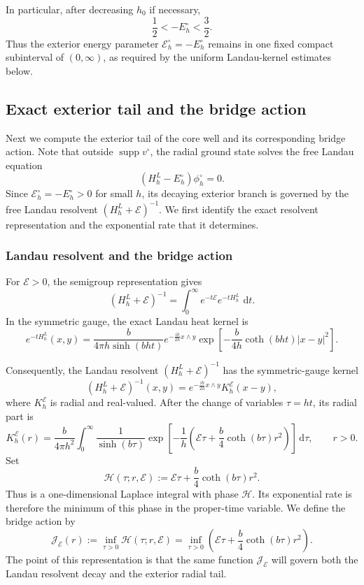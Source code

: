 \documentclass[11pt]{article}
\newcommand{\dd}{\,\mathrm d}
\newcommand{\cE}{\mathcal E}
\newcommand{\cJ}{\mathcal J}
\newcommand{\wedgep}{\mathbin{\wedge}}
\newcommand{\supp}{\operatorname{supp}}
\begin{document}
In particular, after decreasing $h_0$ if necessary,
\begin{equation}\label{eq:radial-energy-window}
 \frac12<-E_h^\circ<\frac32.
\end{equation}
Thus the exterior energy parameter $\cE_h^\circ=-E_h^\circ$ remains in one
fixed compact subinterval of $(0,\infty)$, as required by the uniform
Landau-kernel estimates below. 

\subsection{Exact exterior tail and the bridge action}\label{sec:radial-exterior-tail}
Next we compute the exterior tail of the core well and its corresponding bridge action. Note that outside $\supp v^\circ$, the radial ground state solves the free Landau
equation
\[
 (H_h^L-E_h^\circ)\phi_h^\circ=0.
\]
Since $\cE_h^\circ=-E_h^\circ>0$ for small $h$, its decaying exterior branch is governed by the free Landau resolvent $(H_h^L+\cE)^{-1}$.  We first identify the exact resolvent representation and the exponential rate that it determines.

\subsubsection{Landau resolvent and the bridge action}
For $\cE>0$, the semigroup representation gives
\[
 (H_h^L+\cE)^{-1}
 =\int_0^\infty e^{-t\cE}e^{-tH_h^L}\,\dd t.
\]
In the symmetric gauge, the exact Landau heat kernel is
\[
 e^{-tH_h^L}(x,y)
 =\frac{b}{4\pi h\sinh(bht)}
 e^{-\frac{ib}{2h}x\wedgep y}
 \exp\!\left[-\frac{b}{4h}\coth(bht)|x-y|^2\right].
\]

Consequently, the Landau resolvent $(H_h^L+\cE)^{-1}$ has the symmetric-gauge kernel
\begin{equation}\label{eq:landau-kernel-master}
 (H_h^L+\cE)^{-1}(x,y)
 =e^{-\frac{ib}{2h}x\wedgep y}K_h^\cE(x-y),
\end{equation}
where $K_h^\cE$ is radial and real-valued.   After the change of variables $\tau=ht$, its radial part is
\begin{equation}\label{eq:K-integral}
 K_h^{\cE}(r)
 =\frac{b}{4\pi h^2}
 \int_0^\infty
 \frac{1}{\sinh(b\tau)}
 \exp\!\left[-\frac1h\left(
 \cE\tau+\frac b4\coth(b\tau)r^2
 \right)\right]\dd\tau,
 \qquad r>0.
\end{equation}
Set
\[
 \mathcal H(\tau;r,\cE)
 :=\cE\tau+\frac b4\coth(b\tau)r^2.
\]
Thus  is a one-dimensional Laplace integral with phase $\mathcal H$.  Its exponential rate is therefore the minimum of this phase in the proper-time variable.  We define the bridge action by
\begin{equation}\label{eq:J}
 \cJ_\cE(r)
 :=\inf_{\tau>0}\mathcal H(\tau;r,\cE)
 =\inf_{\tau>0}\left(\cE\tau+\frac b4\coth(b\tau)r^2\right).
\end{equation}
The point of this representation is that the same function $\cJ_\cE$ will govern both the Landau resolvent decay and the exterior radial tail.
\end{document}
